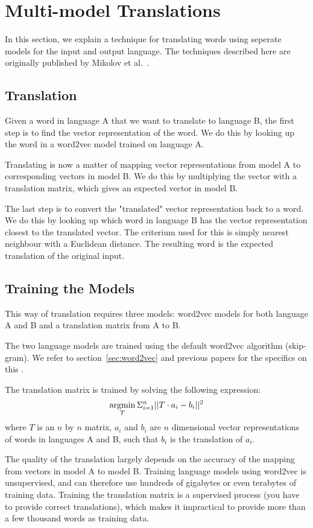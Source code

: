 \section{Multi-model Translations}
\label{sec:multi-model-translations}
In this section, we explain a technique for translating words using seperate models for the input and output language. The techniques described here are originally published by Mikolov et al.~\cite{mikolov2013exploiting}.

\subsection{Translation}
Given a word in language A that we want to translate to language B, the first step is to find the vector representation of the word. We do this by looking up the word in a word2vec model trained on language A.

Translating is now a matter of mapping vector representations from model A to corresponding vectors in model B. We do this by multiplying the vector with a translation matrix, which gives an expected vector in model B.

The last step is to convert the "translated" vector representation back to a word. We do this by looking up which word in language B has the vector representation closest to the translated vector. The criterium used for this is simply nearest neighbour with a Euclidean distance. The resulting word is the expected translation of the original input.

\subsection{Training the Models}
This way of translation requires three models: word2vec models for both language A and B and a translation matrix from A to B.

The two language models are trained using the default word2vec algorithm (skip-gram). We refer to section~\ref{sec:word2vec} and previous papers for the specifics on this \cite{mikolov2013efficient, mikolov2013distributed}.

The translation matrix is trained by solving the following expression:
$$ \argmin_{T} \Sigma_{i=1}^{n} || T \cdot a_i - b_i || ^{2}$$
where $T$ is an $n$ by $n$ matrix, $a_i$ and $b_i$ are $n$ dimensional vector representations of words in languages A and B, such that $b_i$ is the translation of $a_i$.

The quality of the translation largely depends on the accuracy of the mapping from vectors in model A to model B. Training language models using word2vec is unsupervised, and can therefore use hundreds of gigabytes or even terabytes of training data. Training the translation matrix is a supervised process (you have to provide correct translations), which makes it impractical to provide more than a few thousand words as training data.

